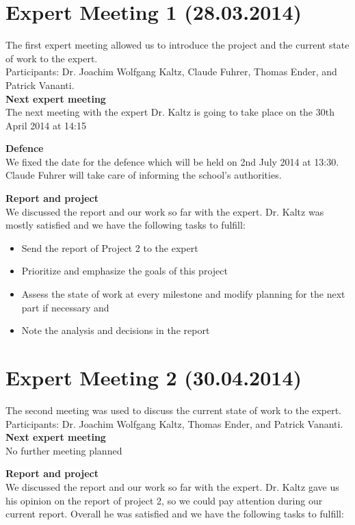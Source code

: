 \documentclass[
	a4paper,					10pt,							twoside,					openright,				notitlepage,			parskip=half,			]{scrreprt}
\begin{document}
\section*{Expert Meeting 1 (28.03.2014)}
\label{sec:expert_meeting_1}

The first expert meeting allowed us to introduce the project and the current state of work to the expert.\\
Participants: Dr. Joachim Wolfgang Kaltz, Claude Fuhrer, Thomas Ender, and Patrick Vananti.\\

\textbf{Next expert meeting} \\
The next meeting with the expert Dr. Kaltz is going to take place on the 30th April 2014 at 14:15

\textbf{Defence}\\
We fixed the date for the defence which will be held on 2nd July 2014 at 13:30.
Claude Fuhrer will take care of informing the school's authorities.

\textbf{Report and project}\\
We discussed the report and our work so far with the expert. Dr. Kaltz was mostly satisfied and we have the following tasks to fulfill:

\begin{itemize}
\item{Send the report of Project 2 to the expert}
\item{Prioritize and emphasize the goals of this project}
\item{Assess the state of work at every milestone and modify planning for the next part if necessary and}
\item{Note the analysis and decisions in the report}
\end{itemize}


\section*{Expert Meeting 2 (30.04.2014)}
\label{sec:expert_meeting_2}

The second meeting was used to discuss the current state of work to the expert.\\
Participants: Dr. Joachim Wolfgang Kaltz, Thomas Ender, and Patrick Vananti.\\

\textbf{Next expert meeting} \\
No further meeting planned

\textbf{Report and project}\\
We discussed the report and our work so far with the expert. Dr. Kaltz gave us his opinion on the report of project 2,
so we could pay attention during our current report. Overall he was satisfied and we have the following tasks to fulfill:
\end{document}
